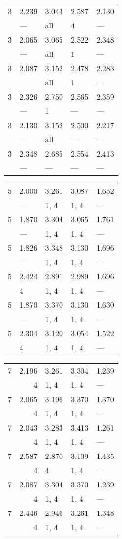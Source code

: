 \begin{tabular}{lllll}
\toprule
 3 & 2.239 & 3.043 & 2.587 & 2.130 \\
   & ---   & all   & 4     & ---   \\
 3 & 2.065 & 3.065 & 2.522 & 2.348 \\
   & ---   & all   & 1     & ---   \\
 3 & 2.087 & 3.152 & 2.478 & 2.283 \\
   & ---   & all   & 1     & ---   \\
 3 & 2.326 & 2.750 & 2.565 & 2.359 \\
   & ---   & 1     & ---   & ---   \\
 3 & 2.130 & 3.152 & 2.500 & 2.217 \\
   & ---   & all   & ---   & ---   \\
 3 & 2.348 & 2.685 & 2.554 & 2.413 \\
   & ---   & ---   & ---   & ---   \\
\bottomrule
\end{tabular}
\begin{tabular}{lllll}
\toprule
 5 & 2.000 & 3.261 & 3.087 & 1.652 \\
   & ---   & 1, 4  & 1, 4  & ---   \\
 5 & 1.870 & 3.304 & 3.065 & 1.761 \\
   & ---   & 1, 4  & 1, 4  & ---   \\
 5 & 1.826 & 3.348 & 3.130 & 1.696 \\
   & ---   & 1, 4  & 1, 4  & ---   \\
 5 & 2.424 & 2.891 & 2.989 & 1.696 \\
   & 4     & 1, 4  & 1, 4  & ---   \\
 5 & 1.870 & 3.370 & 3.130 & 1.630 \\
   & ---   & 1, 4  & 1, 4  & ---   \\
 5 & 2.304 & 3.120 & 3.054 & 1.522 \\
   & 4     & 1, 4  & 1, 4  & ---   \\
\bottomrule
\end{tabular}
\begin{tabular}{lrlll}
\toprule
 7 & 2.196 & 3.261 & 3.304 & 1.239 \\
   & 4     & 1, 4  & 1, 4  & ---   \\
 7 & 2.065 & 3.196 & 3.370 & 1.370 \\
   & 4     & 1, 4  & 1, 4  & ---   \\
 7 & 2.043 & 3.283 & 3.413 & 1.261 \\
   & 4     & 1, 4  & 1, 4  & ---   \\
 7 & 2.587 & 2.870 & 3.109 & 1.435 \\
   & 4     & 4     & 1, 4  & ---   \\
 7 & 2.087 & 3.304 & 3.370 & 1.239 \\
   & 4     & 1, 4  & 1, 4  & ---   \\
 7 & 2.446 & 2.946 & 3.261 & 1.348 \\
   & 4     & 1, 4  & 1, 4  & ---   \\
\bottomrule
\end{tabular}
